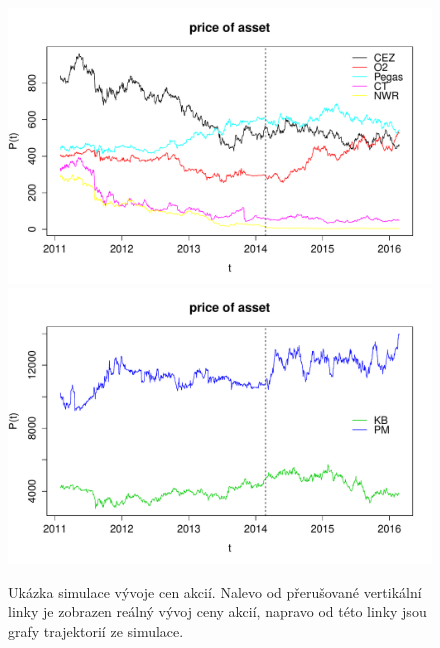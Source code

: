 \documentclass[a4paper,12pt]{report}
\theoremstyle{definition} \newtheorem{definice}[veta]{Definice}
\theoremstyle{remark}
\begin{document}
\begin{figure}[!htbp]
  \centering 
	\includegraphics[width=13.5cm, clip, trim= 0 15 25 50]{IMG/ds_price_of_asset_ostatni.pdf}\\[5mm]
	\includegraphics[width=13.5cm, clip, trim= 0 15 25 50]{IMG/ds_price_of_asset_KBPM_v2.pdf}	
  \caption{Ukázka simulace vývoje cen akcií. Nalevo od přerušované vertikální linky je zobrazen reálný vývoj ceny akcií, napravo od této linky jsou grafy trajektorií ze simulace.}  \label{model_cen}
\end{figure}
\end{document}
